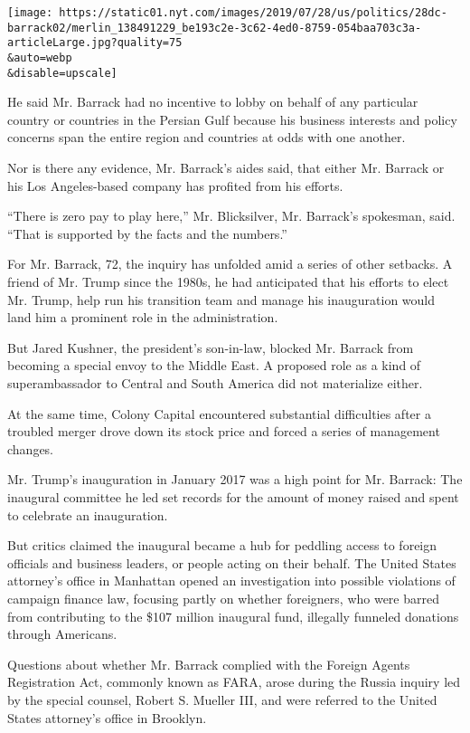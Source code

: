 \texttt{[image: https://static01.nyt.com/images/2019/07/28/us/politics/28dc-barrack02/merlin\_138491229\_be193c2e-3c62-4ed0-8759-054baa703c3a-articleLarge.jpg?quality=75\\\&auto=webp\\\&disable=upscale]}

He said Mr. Barrack had no incentive to lobby on behalf of any
particular country or countries in the Persian Gulf because his business
interests and policy concerns span the entire region and countries at
odds with one another.

Nor is there any evidence, Mr. Barrack's aides said, that either Mr.
Barrack or his Los Angeles-based company has profited from his efforts.

``There is zero pay to play here,'' Mr. Blicksilver, Mr. Barrack's
spokesman, said. ``That is supported by the facts and the numbers.''

For Mr. Barrack, 72, the inquiry has unfolded amid a series of other
setbacks. A friend of Mr. Trump since the 1980s, he had anticipated that
his efforts to elect Mr. Trump, help run his transition team and manage
his inauguration would land him a prominent role in the administration.

But Jared Kushner, the president's son-in-law, blocked Mr. Barrack from
becoming a special envoy to the Middle East. A proposed role as a kind
of superambassador to Central and South America did not materialize
either.

At the same time, Colony Capital encountered substantial difficulties
after a troubled merger drove down its stock price and forced a series
of management changes.

Mr. Trump's inauguration in January 2017 was a high point for Mr.
Barrack: The inaugural committee he led set records for the amount of
money raised and spent to celebrate an inauguration.

But critics claimed the inaugural became a hub for peddling access to
foreign officials and business leaders, or people acting on their
behalf. The United States attorney's office in Manhattan opened an
investigation into possible violations of campaign finance law, focusing
partly on whether foreigners, who were barred from contributing to the
\$107 million inaugural fund, illegally funneled donations through
Americans.

Questions about whether Mr. Barrack complied with the Foreign Agents
Registration Act, commonly known as FARA, arose during the Russia
inquiry led by the special counsel, Robert S. Mueller III, and were
referred to the United States attorney's office in Brooklyn.

